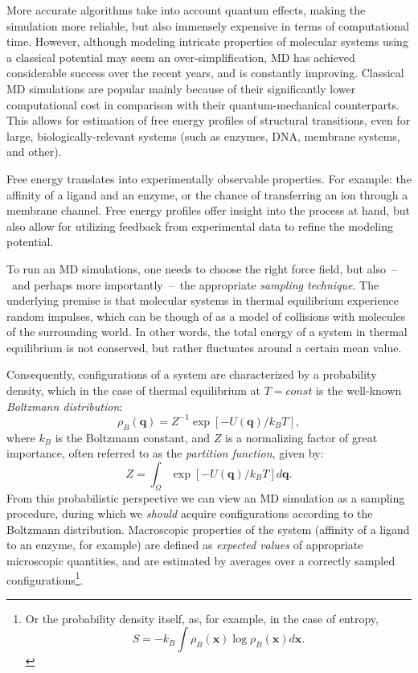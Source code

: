 \documentclass[a4paper,11pt,twoside]{book}%
\begin{document}
More accurate algorithms take into account quantum effects, making the simulation more reliable, but also immensely expensive in terms of computational time.
However, although modeling intricate properties of molecular systems using a classical potential may seem an over-simplification, MD has achieved considerable success over the recent years, and is constantly improving.
Classical MD simulations are popular mainly because of their significantly lower computational cost in comparison with their quantum-mechanical counterparts.
This allows for estimation of free energy profiles of structural transitions, even for large, biologically-relevant systems (such as enzymes, DNA, membrane systems, and other).

Free energy translates into experimentally observable properties.
For example: the affinity of a ligand and an enzyme, or the chance of transferring an ion through a membrane channel.
Free energy profiles offer insight into the process at hand, but also allow for utilizing feedback from experimental data to refine the modeling potential.

To run an MD simulations, one needs to choose the right force field, but also~--~and perhaps more importantly~--~the appropriate \emph{sampling technique}.
The underlying premise is that molecular systems in thermal equilibrium experience random impulses, which can be though of as a model of collisions with molecules of the surrounding world.
In other words, the total energy of a system in thermal equilibrium is not conserved, but rather fluctuates around a certain mean value.

Consequently, configurations of a system are characterized by a probability density, which in the case of thermal equilibrium at $T=const$ is the well-known \emph{Boltzmann distribution}:
\begin{equation}
 \rho_B(\mathbf{q})=Z^{-1} \exp[-U(\mathbf{q})/k_BT],
\end{equation}
where $k_B$ is the Boltzmann constant, and $Z$ is a normalizing factor of great importance, often referred to as the \emph{partition function}, given by: $$Z=\int_\Omega \exp[-U(\mathbf{q})/k_BT] d\mathbf{q}.$$
From this probabilistic perspective we can view an MD simulation as a sampling procedure, during which we \emph{should} acquire configurations according to the Boltzmann distribution.
Macroscopic properties of the system (affinity of a ligand to an enzyme, for example) are defined as \emph{expected values} of appropriate microscopic quantities, and are estimated by averages over a correctly sampled configurations\footnote{Or the probability density itself, as, for example, in the case of entropy, $$S=-k_B \int \rho_B(\mathbf{x})\log\rho_B(\mathbf{x}) d\mathbf{x}.$$}.
\end{document}
